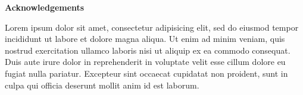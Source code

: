 
\vspace*{\fill}
\begin{center}
\textbf{Acknowledgements}
\end{center}
{\color{red} Lorem ipsum dolor sit amet, consectetur adipisicing elit, sed do eiusmod tempor incididunt ut labore et dolore magna aliqua. Ut enim ad minim veniam, quis nostrud exercitation ullamco laboris nisi ut aliquip ex ea commodo consequat. Duis aute irure dolor in reprehenderit in voluptate velit esse cillum dolore eu fugiat nulla pariatur. Excepteur sint occaecat cupidatat non proident, sunt in culpa qui officia deserunt mollit anim id est laborum.}
\vspace*{\fill}
